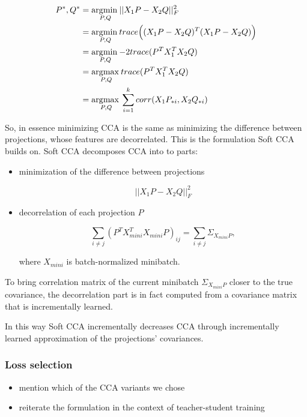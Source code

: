 \begin{align}
  P^\ast, Q^\ast &= \underset{P, Q}{\operatorname*{\arg\!\min\medspace}} ||X_1P - X_2Q||^2_F \\
  &= \underset{P, Q}{\operatorname*{\arg\!\min\medspace}} trace\Big((X_1P - X_2Q)^T(X_1P - X_2Q)\Big) \\
  &= \underset{P, Q}{\operatorname*{\arg\!\min\medspace}} {-2} trace(P^TX_1^TX_2Q) \\
  &= \underset{P, Q}{\operatorname*{\arg\!\max\medspace}} trace(P^TX_1^TX_2Q) \\
  &= \underset{P, Q}{\operatorname*{\arg\!\max\medspace}} \sum_{i = 1}^k corr(X_1P_{*i}, X_2Q_{*i})
\end{align}

So, in essence minimizing CCA is the same as minimizing the difference between
projections, whose features are decorrelated. This is the formulation Soft CCA
builds on. Soft CCA decomposes CCA into to parts:

\begin{itemize}
  \item minimization of the difference between projections

    \begin{equation}
      ||X_1P - X_2Q||^2_F
    \end{equation}

  \item decorrelation of each projection $P$

    \begin{equation}
      \sum_{i \ne j} (P^TX^T_{mini}X_{mini}P)_{ij} = \sum_{i \ne j} \Sigma_{X_{mini}P},
    \end{equation}

    where $X_{mini}$ is batch-normalized minibatch.

\end{itemize}

To bring correlation matrix of the current minibatch $\Sigma_{X_{mini}P}$
closer to the true covariance, the decorrelation part is in fact computed from
a covariance matrix that is incrementally learned.

In this way Soft CCA incrementally decreases CCA through incrementally learned
approximation of the projections' covariances.

\subsubsection{Loss selection}

\begin{itemize}
    \item mention which of the CCA variants we chose
    \item reiterate the formulation in the context of teacher-student training
\end{itemize}

